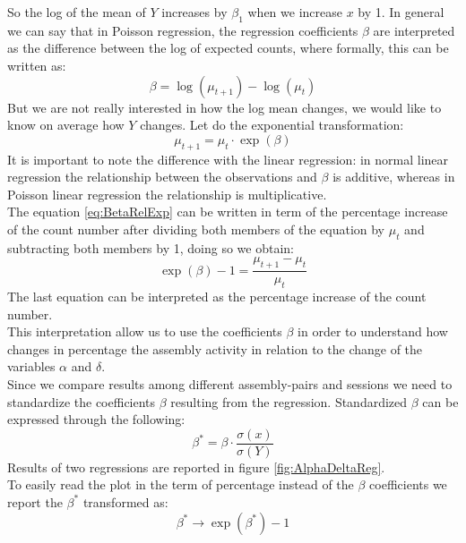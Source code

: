 So the log of the mean of $Y$ increases by $\beta_1$ when we increase $x$ by 1.
In general we can say that in Poisson regression, the regression coefficients $\beta$ are interpreted as the difference between the log of expected counts, where formally, this can be written as:
\begin{equation}
    \beta=\log(\mu_{t+1})-\log(\mu_t)
    \label{eq:BetaRelLog}
\end{equation}
But we are not really interested in how the log mean changes, we would like to know on average how $Y$ changes. 
Let do the exponential transformation:
\begin{equation}
    \mu_{t+1}=\mu_t\cdot \exp(\beta)
    \label{eq:BetaRelExp}
\end{equation}
It is important to note the difference with the linear regression: in normal linear regression the relationship between the observations and $\beta$ is additive, whereas in Poisson linear regression the relationship is multiplicative.\\
The equation \ref{eq:BetaRelExp} can be written in term of the percentage increase of the count number after dividing both members of the equation by $\mu_t$ and subtracting both members by 1, doing so we obtain:
\begin{equation}
\exp(\beta)-1=\frac{\mu_{t+1}-\mu_t}{\mu_t}
    \label{eq:BetaPerc}
\end{equation}
The last equation can be interpreted as the percentage increase of the count number.\\
This interpretation allow us to use the coefficients  $\beta$ in order to understand how changes in percentage the assembly activity in relation to the change of the variables $\alpha$ and $\delta$.\\Since we compare results among different assembly-pairs and sessions we need to standardize the coefficients $\beta$ resulting from the regression. Standardized $\beta$ can be expressed through the following:
\begin{equation}
    \beta^*=\beta\cdot\frac{\sigma(x)}{\sigma(Y)}
    \label{eq:betaStand}
\end{equation}
Results of two regressions are reported in figure \ref{fig:AlphaDeltaReg}.\\
To easily read the plot in the term of percentage instead of the $\beta$ coefficients we report the $\beta^*$ transformed as:
\begin{equation}
    \beta^*\rightarrow \exp(\beta^*)-1
    \label{eq:BetaPlot}
\end{equation}
